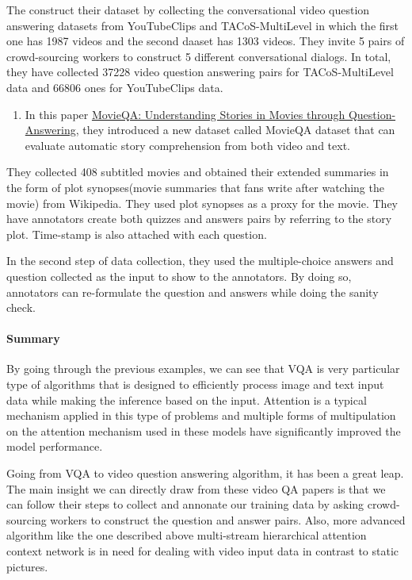 \documentclass[]{book}
\providecommand{\tightlist}{%
  \setlength{\itemsep}{0pt}\setlength{\parskip}{0pt}}
\let\oldparagraph\paragraph
\renewcommand{\paragraph}[1]{\oldparagraph{#1}\mbox{}}
\theoremstyle{definition}
\theoremstyle{definition}
\theoremstyle{definition}
\theoremstyle{remark}
\begin{document}
The construct their dataset by collecting the conversational video
question answering datasets from YouTubeClips and TACoS-MultiLevel in
which the first one has 1987 videos and the second daaset has 1303
videos. They invite 5 pairs of crowd-sourcing workers to construct 5
different conversational dialogs. In total, they have collected 37228
video question answering pairs for TACoS-MultiLevel data and 66806 ones
for YouTubeClips data.

\begin{enumerate}
\def\labelenumi{\arabic{enumi}.}
\setcounter{enumi}{1}
\tightlist
\item
  In this paper \href{https://arxiv.org/pdf/1512.02902.pdf}{MovieQA:
  Understanding Stories in Movies through Question-Answering}, they
  introduced a new dataset called MovieQA dataset that can evaluate
  automatic story comprehension from both video and text.
\end{enumerate}

They collected 408 subtitled movies and obtained their extended
summaries in the form of plot synopses(movie summaries that fans write
after watching the movie) from Wikipedia. They used plot synopses as a
proxy for the movie. They have annotators create both quizzes and
answers pairs by referring to the story plot. Time-stamp is also
attached with each question.

In the second step of data collection, they used the multiple-choice
answers and question collected as the input to show to the annotators.
By doing so, annotators can re-formulate the question and answers while
doing the sanity check.

\paragraph{Summary}\label{summary-1}

By going through the previous examples, we can see that VQA is very
particular type of algorithms that is designed to efficiently process
image and text input data while making the inference based on the input.
Attention is a typical mechanism applied in this type of problems and
multiple forms of multipulation on the attention mechanism used in these
models have significantly improved the model performance.

Going from VQA to video question answering algorithm, it has been a
great leap. The main insight we can directly draw from these video QA
papers is that we can follow their steps to collect and annonate our
training data by asking crowd-sourcing workers to construct the question
and answer pairs. Also, more advanced algorithm like the one described
above multi-stream hierarchical attention context network is in need for
dealing with video input data in contrast to static pictures.
\end{document}
